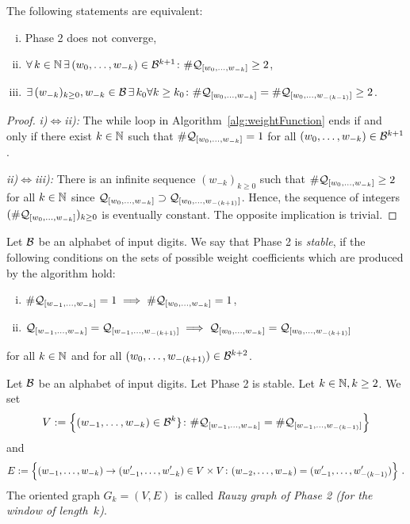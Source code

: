 \begin{lem}
The following statements are equivalent:
\begin{enumerate}[i)]
	\item Phase 2 does not converge,
	\item $\forall \,k\in \NN \,\exists\, \tupleo{k}\in\B^{k+1} \colon \#\Qwo{k}\geq 2$,
	\item $\exists \,(w_{-k})_{k\geq 0}, w_{-k}\in\B \,\exists\, k_0\forall k\geq k_0 \colon \#\Qwo{k}=\#\Qwo{(k-1)}\geq 2$.
\end{enumerate}
\begin{proof}
\textit{i)}$\iff$\textit{ii):} The while loop in Algorithm~\ref{alg:weightFunction} ends if and only if there exist $k\in\NN$ such that $\#\Qwo{k}=1$ for all $\tupleo{k}\in\B^{k+1}$.

\textit{ii)}$\iff$\textit{iii):} There is an infinite sequence $(w_{-k})_{k\geq 0}$ such that $\#\Qwo{k}\geq 2$ for all $k\in\NN$ since $\Qwo{k}\supset\Qwo{(k+1)}$. Hence, the sequence of integers $(\#\Qwo{k})_{k\geq 0}$ is eventually constant. The opposite implication is trivial.
\end{proof}
\end{lem}

\begin{defn}
Let $\B$ be an alphabet of input digits. We say that Phase 2 is \emph{stable}, if the following conditions on the sets of possible weight coefficients which are produced by the algorithm hold: 
\begin{enumerate}[i)]
	\item $\#\Qw{1}{k}=1 \implies \#\Qwo{k}=1$,
	\item $\Qw{1}{k}=\Qw{1}{(k+1)} \implies \Qwo{k}=\Qwo{(k+1)}$
\end{enumerate}
for all $k\in\NN$ and for all $\tupleo{(k+1)} \in \B^{k+2}$.
\end{defn}


\begin{defn}
Let $\B$ be an alphabet of input digits. Let Phase 2 is stable. Let $k\in\NN, k\geq 2$. We set
$$
V:=\left\{\tuple{1}{k}\in\B^k\} \colon \#\Qw{1}{k}=\#\Qw{1}{(k-1)}\right\}
$$
and
$$
E:=\left\{\tuple{1}{k}\rightarrow\tuple[w']{1}{k}\in V\times V \colon \tuple{2}{k}=\tuple[w']{1}{(k-1)}\right\}\,.
$$
The oriented graph $G_k=(V,E)$ is called \emph{Rauzy graph of Phase 2 (for the window of length~$k$)}.
\end{defn}

